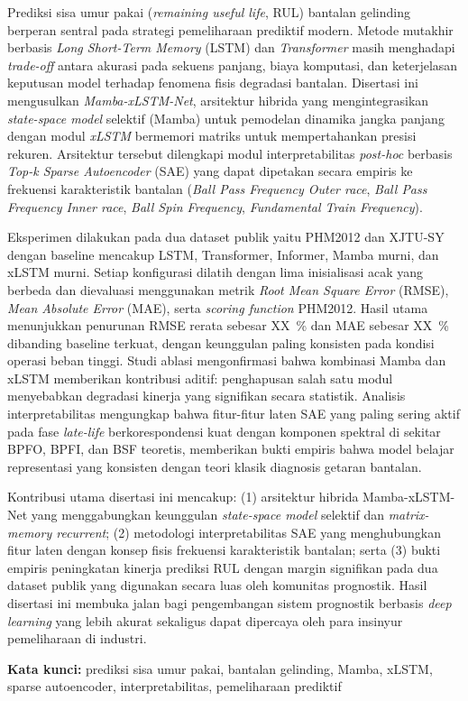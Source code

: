 
\begin{abstrak}

Prediksi sisa umur pakai (\emph{remaining useful life}, RUL) bantalan
gelinding berperan sentral pada strategi pemeliharaan prediktif modern.
Metode mutakhir berbasis \emph{Long Short-Term Memory} (LSTM) dan
\emph{Transformer} masih menghadapi \emph{trade-off} antara akurasi pada
sekuens panjang, biaya komputasi, dan keterjelasan keputusan model
terhadap fenomena fisis degradasi bantalan. Disertasi ini mengusulkan
\emph{Mamba-xLSTM-Net}, arsitektur hibrida yang mengintegrasikan
\emph{state-space model} selektif (Mamba) untuk pemodelan dinamika
jangka panjang dengan modul \emph{xLSTM} bermemori matriks untuk
mempertahankan presisi rekuren. Arsitektur tersebut dilengkapi modul
interpretabilitas \emph{post-hoc} berbasis \emph{Top-k Sparse
Autoencoder} (SAE) yang dapat dipetakan secara empiris ke frekuensi
karakteristik bantalan (\emph{Ball Pass Frequency Outer race},
\emph{Ball Pass Frequency Inner race}, \emph{Ball Spin Frequency},
\emph{Fundamental Train Frequency}).

Eksperimen dilakukan pada dua dataset publik yaitu PHM2012 dan XJTU-SY
dengan baseline mencakup LSTM, Transformer, Informer, Mamba murni, dan
xLSTM murni. Setiap konfigurasi dilatih dengan lima inisialisasi acak
yang berbeda dan dievaluasi menggunakan metrik \emph{Root Mean Square
Error} (RMSE), \emph{Mean Absolute Error} (MAE), serta \emph{scoring
function} PHM2012. Hasil utama menunjukkan penurunan RMSE rerata
sebesar XX~\% dan MAE sebesar XX~\% dibanding baseline terkuat, dengan
keunggulan paling konsisten pada kondisi operasi beban tinggi. Studi
ablasi mengonfirmasi bahwa kombinasi Mamba dan xLSTM memberikan
kontribusi aditif: penghapusan salah satu modul menyebabkan degradasi
kinerja yang signifikan secara statistik. Analisis interpretabilitas
mengungkap bahwa fitur-fitur laten SAE yang paling sering aktif pada
fase \emph{late-life} berkorespondensi kuat dengan komponen spektral di
sekitar BPFO, BPFI, dan BSF teoretis, memberikan bukti empiris bahwa
model belajar representasi yang konsisten dengan teori klasik diagnosis
getaran bantalan.

Kontribusi utama disertasi ini mencakup: (1) arsitektur hibrida
Mamba-xLSTM-Net yang menggabungkan keunggulan \emph{state-space model}
selektif dan \emph{matrix-memory recurrent}; (2) metodologi
interpretabilitas SAE yang menghubungkan fitur laten dengan konsep
fisis frekuensi karakteristik bantalan; serta (3) bukti empiris
peningkatan kinerja prediksi RUL dengan margin signifikan pada dua
dataset publik yang digunakan secara luas oleh komunitas prognostik.
Hasil disertasi ini membuka jalan bagi pengembangan sistem prognostik
berbasis \emph{deep learning} yang lebih akurat sekaligus dapat
dipercaya oleh para insinyur pemeliharaan di industri.

\vspace{0.5cm}
\noindent
\textbf{Kata kunci:} prediksi sisa umur pakai, bantalan gelinding,
Mamba, xLSTM, sparse autoencoder, interpretabilitas, pemeliharaan
prediktif

\end{abstrak}
